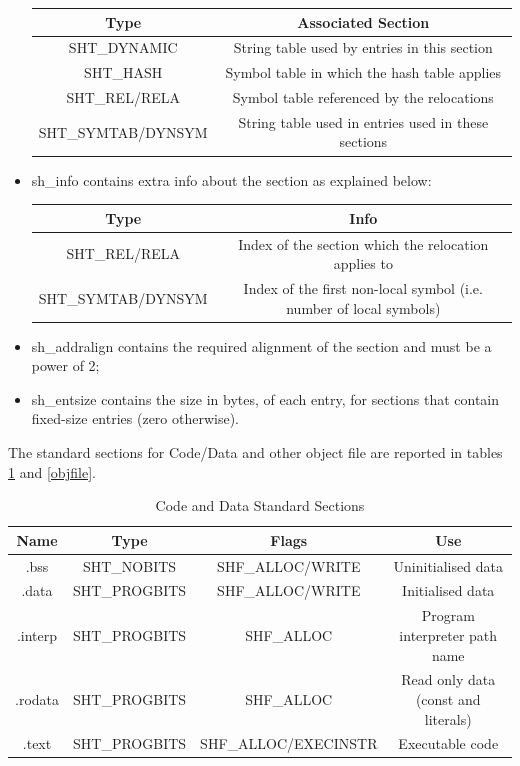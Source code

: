 \documentclass[paper=a4, fontsize=11pt]{report} %
\numberwithin{equation}{section} %
\numberwithin{figure}{section} %
\numberwithin{table}{section} %
\begin{document}
\begin{itemize}
\begin{center}
\begin{tabular}{|c|c|}
			\hline
			\textbf{Type} & \textbf{Associated Section} \\ \hline
			{\ttfamily SHT\_DYNAMIC} & String table used by entries in this 
			section\\ \hline
			{\ttfamily SHT\_HASH} & Symbol table in which the hash table 
			applies\\ \hline
			{\ttfamily SHT\_REL/RELA} & Symbol table referenced by the 
			relocations\\ \hline
			{\ttfamily SHT\_SYMTAB/DYNSYM} & String table used in entries used 
			in these sections\\ \hline
		\end{tabular}
	\end{center}
	\item {\ttfamily sh\_info} contains extra info about the section as 
	explained below:
	\begin{center}
		\begin{tabular}{|c|c|}
			\hline
			\textbf{Type} & \textbf{Info} \\ \hline
			{\ttfamily SHT\_REL/RELA} & Index of the section which the 
			relocation applies to\\ \hline
			{\ttfamily SHT\_SYMTAB/DYNSYM} & Index of the first non-local 
			symbol (i.e. number of local symbols)\\ \hline
		\end{tabular}
	\end{center}
	\item {\ttfamily sh\_addralign} contains the required alignment of the 
	section and must be a power of 2;
	\item {\ttfamily sh\_entsize} contains the size in bytes, of each entry, 
	for sections that contain fixed-size entries (zero otherwise).
\end{itemize}
The standard sections for Code/Data and other object file are reported in 
tables \ref{codedata} and \ref{objfile}.
\begin{table}[!htbp]
	\begin{center}
		\begin{tabular}{|c|c|c|c|}
			\hline
			\textbf{Name} & \textbf{Type} & \textbf{Flags} & \textbf{Use}\\ 
			\hline
			{\ttfamily .bss} & {\ttfamily SHT\_NOBITS} & {\ttfamily 
			SHF\_ALLOC/WRITE} & Uninitialised data\\ \hline
			{\ttfamily .data} & {\ttfamily SHT\_PROGBITS} & {\ttfamily 
			SHF\_ALLOC/WRITE} & Initialised data\\ \hline
			{\ttfamily .interp} & {\ttfamily SHT\_PROGBITS} & {\ttfamily 
			SHF\_ALLOC} & Program interpreter path name\\ \hline
			{\ttfamily .rodata} & {\ttfamily SHT\_PROGBITS} & {\ttfamily 
			SHF\_ALLOC} & Read only data (const and literals)\\ \hline
			{\ttfamily .text} & {\ttfamily SHT\_PROGBITS} & {\ttfamily 
			SHF\_ALLOC/EXECINSTR} & Executable code\\ \hline
		\end{tabular}
		\caption{Code and Data Standard Sections}
		\label{codedata}
	\end{center}
\end{table}
\end{document}
